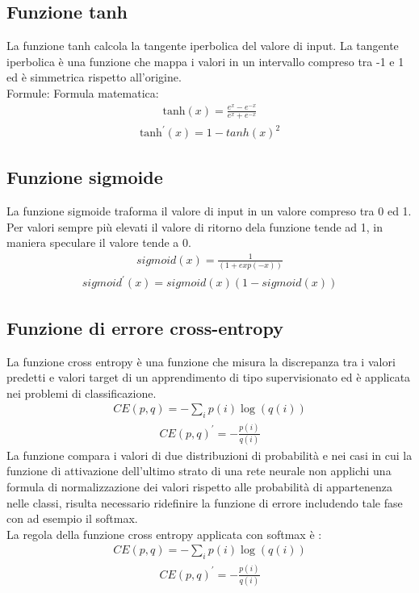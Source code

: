 \subsection{Funzione tanh}
La funzione tanh calcola la tangente iperbolica del valore di input. La tangente iperbolica è una funzione che mappa i valori in un intervallo compreso tra -1 e 1 ed è simmetrica rispetto all'origine.\\
Formule:
Formula matematica:
\begin{align*}
\text{tanh}(x) = \frac{e^x - e^{-x}}{e^x + e^{-x}} 
\end{align*}
\begin{align*}
\text{tanh}^{\prime}(x) = 1 - tanh(x)^2
\end{align*}
\subsection{Funzione sigmoide}
La funzione sigmoide traforma il valore di input in un valore compreso tra 0 ed 1. Per valori sempre più elevati il valore di ritorno dela funzione tende ad 1, in maniera speculare il valore tende a 0.
\begin{align*}
sigmoid(x) = \frac{1}{(1 + exp(-x))}
\end{align*}
\begin{align*}
sigmoid^{\prime}(x) = sigmoid(x)(1 - sigmoid(x))
\end{align*}
\subsection{Funzione di errore cross-entropy}
La funzione cross entropy è una funzione che misura la discrepanza tra i valori predetti e valori target di un apprendimento di tipo supervisionato ed è applicata nei problemi di classificazione.
\begin{align*}
CE(p,q) = -\sum_{i} p(i) \log(q(i))
\end{align*}
\begin{align*}
CE(p,q)^{\prime}= -\frac{p(i)}{q(i)}
\end{align*}
La funzione compara i valori di due distribuzioni di probabilità e nei casi in cui la funzione di attivazione dell'ultimo strato di una rete neurale non applichi una formula di normalizzazione dei valori rispetto alle probabilità di appartenenza nelle classi, risulta necessario ridefinire la funzione di errore includendo tale fase con ad esempio il softmax.\\
La regola della funzione cross entropy applicata con softmax è :
\begin{align*}
CE(p,q) = -\sum_{i} p(i) \log(q(i))
\end{align*}
\begin{align*}
CE(p,q)^{\prime} = -\frac{p(i)}{q(i)}
\end{align*}
